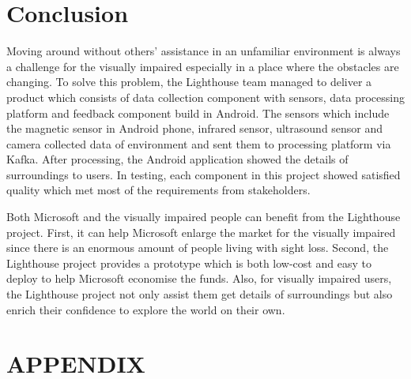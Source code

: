 \documentclass[prodmode,acmtosem]{acmsmall} %
\begin{document}
\section{Conclusion}
Moving around without others’ assistance in an unfamiliar environment is always a challenge for the visually impaired especially in a place where the obstacles are changing. To solve this problem, the Lighthouse team managed to deliver a product which consists of data collection component with sensors, data processing platform and feedback component build in Android. The sensors which include the magnetic sensor in Android phone, infrared sensor, ultrasound sensor and camera collected data of environment and sent them to processing platform via Kafka. After processing, the Android application showed the details of surroundings to users. In testing, each component in this project showed satisfied quality which met most of the requirements from stakeholders. 

Both Microsoft and the visually impaired people can benefit from the Lighthouse project. First, it can help Microsoft enlarge the market for the visually impaired since there is an enormous amount of people living with sight loss. Second, the Lighthouse project provides a prototype which is both low-cost and easy to deploy to help Microsoft economise the funds. Also, for visually impaired users, the Lighthouse project not only assist them get details of surroundings but also enrich their confidence to explore the world on their own. 



\appendix
\section*{APPENDIX} \label{Appendix}
\setcounter{section}{1}


\begin{acks}
\end{acks}  





\elecappendix
\end{document}
